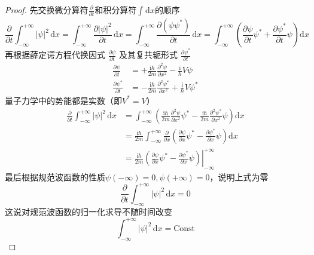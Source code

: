 \begin{proof}
    先交换微分算符$\frac{\partial }{\partial t}$和积分算符$\int_{}^{}\mathrm{d}x$的顺序
    $$
        \frac{\partial }{\partial t}\int_{-\infty}^{+\infty}|\psi|^2 \,\mathrm{d}x
        =\int_{-\infty}^{+\infty}\frac{\partial |\psi|^2}{\partial t} \,\mathrm{d}x
        =\int_{-\infty}^{+\infty}\frac{\partial (\psi\psi^*)}{\partial t} \,\mathrm{d}x
        =\int_{-\infty}^{+\infty}\left(\frac{\partial \psi}{\partial t}\psi^*+\frac{\partial \psi^*}{\partial t}\psi\right)\mathrm{d}x
    $$
    再根据薛定谔方程代换因式 $\frac{\partial \psi}{\partial t}$ 及其复共轭形式 $\frac{\partial \psi^*}{\partial t}$
    $$
        \begin{aligned}
            \frac{\partial \psi}{\partial t}   & = +\frac{\mathrm{i}\hbar}{2m}\frac{\partial^2\psi}{\partial x^2}-\frac{\mathrm{i}}{\hbar}V\psi     \\
            \frac{\partial \psi^*}{\partial t} & = -\frac{\mathrm{i}\hbar}{2m}\frac{\partial^2\psi^*}{\partial x^2}+\frac{\mathrm{i}}{\hbar}V\psi^*
        \end{aligned}
    $$
    量子力学中的势能都是实数（即$V^*=V$）
    $$
        \begin{aligned}
            \frac{\partial }{\partial t}\int_{-\infty}^{+\infty}|\psi|^2 \,\mathrm{d}x
             & =\int_{-\infty}^{+\infty}\left(\frac{\mathrm{i}\hbar}{2m}\frac{\partial^2 \psi}{\partial x^2}\psi^*-\frac{\mathrm{i}\hbar}{2m}\frac{\partial^2 \psi^*}{\partial x^2}\psi\right)\mathrm{d}x \\
             & =\frac{\mathrm{i}\hbar}{2m}\int_{-\infty}^{+\infty}\frac{\partial}{\partial x}\left(\frac{\partial \psi}{\partial x}\psi^*-\frac{\partial \psi^*}{\partial x}\psi\right)\mathrm{d}x        \\
             & =\frac{\mathrm{i}\hbar}{2m}\left.\left(\frac{\partial \psi}{\partial x}\psi^*-\frac{\partial \psi^*}{\partial x}\psi\right)\right|_{-\infty}^{+\infty}
        \end{aligned}
    $$
    最后根据规范波函数的性质$\psi(-\infty)=0,\psi(+\infty)=0$，说明上式为零
    $$
        \frac{\partial }{\partial t}\int_{-\infty}^{+\infty}|\psi|^2 \,\mathrm{d}x=0
    $$
    这说对规范波函数的归一化求导不随时间改变
    $$
        \int_{-\infty}^{+\infty}|\psi|^2\,\mathrm{d}x=\mathrm{Const}
    $$
\end{proof}


